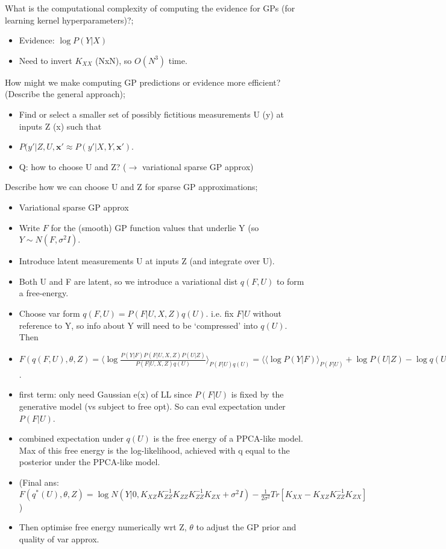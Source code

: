 \documentclass{article}
\begin{document}
What is the computational complexity of computing the evidence for GPs (for learning kernel hyperparameters)?; \begin{itemize}
    \item Evidence:  $\log P(Y|X)$
    \item Need to invert $K_{XX}$ (NxN), so $O(N^3)$ time.
\end{itemize}

How might we make computing GP predictions or evidence more efficient? (Describe the general approach); \begin{itemize}
    \item Find or select a smaller set of possibly fictitious measurements U (y) at inputs Z (x) such that 
    \item $P(y'|Z, U, \mathbf{x'}\approx P(y'|X, Y, \mathbf{x'})$.
    \item Q: how to choose U and Z? ($\rightarrow$ variational sparse GP approx)
\end{itemize}

Describe how we can choose U and Z for sparse GP approximations; \begin{itemize}
    \item Variational sparse GP approx
    \item Write $F$ for the (smooth) GP function values that underlie Y (so $Y\sim N(F, \sigma^2I)$.
    \item Introduce latent measurements U at inputs Z (and integrate over U). 
    \item Both U and F are latent, so we introduce a variational dist $q(F, U)$ to form a free-energy.
    \item Choose var form $q(F, U)=P(F|U, X, Z)q(U)$. i.e. fix $F|U$ without reference to Y, so info about Y will need to be `compressed' into $q(U)$. Then
    \item $F(q(F, U), \theta, Z)=\langle \log \frac{P(Y|F)P(F|U,X,Z)P(U|Z)}{P(F|U,X,Z)q(U)}\rangle_{P(F|U)q(U)} = \langle \langle \log P(Y|F)\rangle_{P(F|U)} + \log P(U|Z) - \log q(U) \rangle_{q(U)}$.
    \item first term: only need Gaussian e(x) of LL since $P(F|U)$ is fixed by the generative model (vs subject to free opt). So can eval expectation under $P(F|U)$.
    \item combined expectation under $q(U)$ is the free energy of a PPCA-like model. Max of this free energy is the log-likelihood, achieved with q equal to the posterior under the PPCA-like model.
    \item (Final ans: $F(q^*(U), \theta, Z)=\log N(Y|0, K_{XZ}K^{-1}_{ZZ}K_{ZZ}K_{ZZ}^{-1}K_{ZX}+\sigma^2I) -\frac{1}{2\sigma^2}Tr[K_{XX}-K_{XZ}K_{ZZ}^{-1}K_{ZX}]$)
    \item Then optimise free energy numerically wrt Z, $\theta$ to adjust the GP prior and quality of var approx.
\end{itemize}
\end{document}
